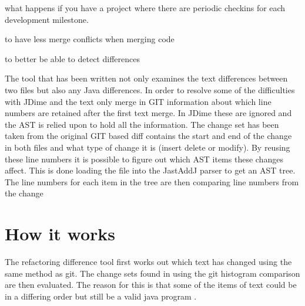 what happens if you have a project where there are periodic checkins for each development milestone.   


to have less merge conflicts when merging code 

to better be able to detect differences

The tool that has been written not only examines the text differences between two files but also any Java differences. In order to resolve some of the difficulties with JDime and  the text only merge in GIT information about which line numbers are retained after the first text merge.  In JDime these are ignored and the AST is relied upon to hold all the information.  The change set has been taken from the original GIT based diff contains the start and end of the change in both files and what type of change it is (insert delete or modify).  By reusing these line numbers it is possible to figure out which AST items these changes affect. This is done loading the file into the JastAddJ parser to get an AST tree. The line numbers for each item in the tree are then comparing line numbers from the change

\section{How it works}

The refactoring difference tool first works out which text has changed using the same method as git.
The change sets found in using the git histogram comparison are then evaluated.
The reason for this is that some of the items of text could be in a differing order but still be a valid java program
.

 



 







